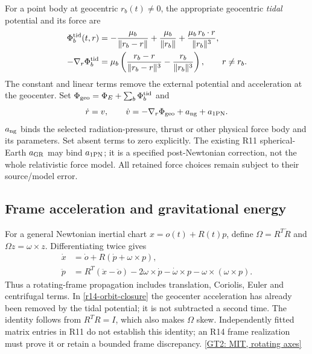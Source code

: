 For a point body at geocentric $r_b(t)\ne0$, the appropriate geocentric
\emph{tidal} potential and its force are
\begin{align}
 \Phi_b^{\rm tid}(t,r)
 &=-\frac{\mu_b}{\|r_b-r\|}+\frac{\mu_b}{\|r_b\|}
       +\frac{\mu_b\,r_b\cdot r}{\|r_b\|^3},\\
 -\nabla_r\Phi_b^{\rm tid}
 &=\mu_b\left(\frac{r_b-r}{\|r_b-r\|^3}
                   -\frac{r_b}{\|r_b\|^3}\right),\qquad r\ne r_b .
 \label{r14-tidal-potential}
\end{align}
The constant and linear terms remove the external potential and acceleration
at the geocenter. Set $\Phi_{\rm geo}=\Phi_E+\sum_b\Phi_b^{\rm tid}$ and
\begin{equation}
 \dot r=v,\qquad \dot v=-\nabla_r\Phi_{\rm geo}+a_{\rm ng}+a_{\rm 1PN} .
 \label{r14-orbit-closure}
\end{equation}
$a_{\rm ng}$ binds the selected radiation-pressure, thrust or other physical
force body and its parameters. Set absent terms to zero explicitly. The
existing R11 spherical-Earth $a_{\rm GR}$ may bind $a_{\rm 1PN}$; it is a
specified post-Newtonian correction, not the whole relativistic force model.
All retained force choices remain subject to their source/model error.

\subsection{Frame acceleration and gravitational energy}
For a general Newtonian inertial chart $x=o(t)+R(t)p$, define
$\Omega=R^T\dot R$ and $\Omega z=\omega\times z$. Differentiating twice gives
\begin{align}
 \dot x&=\dot o+R(\dot p+\omega\times p),\\
 \ddot p&=R^T(\ddot x-\ddot o)-2\omega\times\dot p
           -\dot\omega\times p-\omega\times(\omega\times p).
 \label{r14-frame-acceleration}
\end{align}
Thus a rotating-frame propagation includes translation, Coriolis, Euler and
centrifugal terms. In \eqref{r14-orbit-closure} the geocenter acceleration has
already been removed by the tidal potential; it is not subtracted a second
time. The identity follows from $R^TR=I$, which also makes $\Omega$ skew.
Independently fitted matrix entries in R11 do not establish this identity;
an R14 frame realization must prove it or retain a bounded frame discrepancy.
\href{https://ocw.mit.edu/courses/16-07-dynamics-fall-2009/resources/mit16_07f09_lec08/}{[GT2: MIT, rotating axes]}

